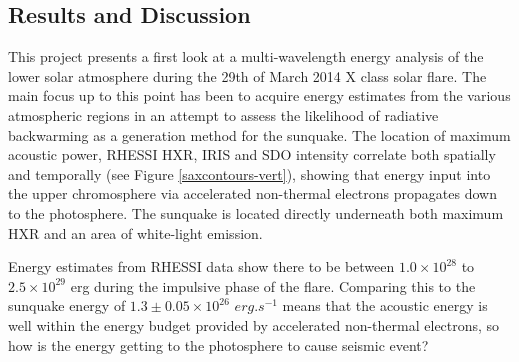 \subsection{Results and Discussion}

This project presents a first look at a multi-wavelength energy analysis of the lower solar atmosphere during the 29th of March 2014 X class solar flare. The main focus up to this point has been to acquire energy estimates from the various atmospheric regions in an attempt to assess the likelihood of radiative backwarming as a generation method for the sunquake. The location of maximum acoustic power, RHESSI HXR, IRIS and SDO intensity correlate both spatially and temporally (see Figure \ref{saxcontours-vert}), showing that energy input into the upper chromosphere via accelerated non-thermal electrons propagates down to the photosphere. The sunquake is located directly underneath both maximum HXR and an area of white-light emission.

Energy estimates from RHESSI data show there to be between $1.0{\times}10^{28}$ to $2.5{\times}10^{29}$ erg during the impulsive phase of the flare. Comparing this to the sunquake energy of $1.3\pm0.05{\times}10^{26}$ $erg.s^{-1}$ means that the acoustic energy is well within the energy budget provided by accelerated non-thermal electrons, so how is the energy getting to the photosphere to cause seismic event?

